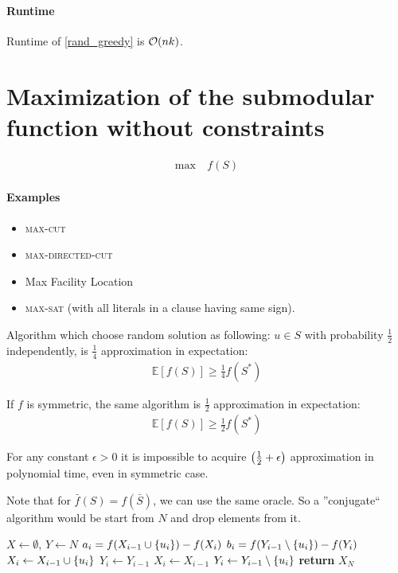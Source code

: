 \paragraph{Runtime} Runtime of \vref{rand_greedy} is $\order{nk}$.

\section{Maximization of the submodular function without constraints}
\begin{align}
\max \: & f(S)
\end{align}
\paragraph{Examples}
\begin{itemize}
\item \textsc{max-cut}
\item \textsc{max-directed-cut}
\item Max Facility Location
\item \textsc{max-sat} (with all literals in a clause having same sign).
\end{itemize}

\begin{prop}
	Algorithm which choose random solution as following: $u\in S$ with probability $\frac{1}{2}$ independently, is $\frac{1}{4}$ approximation in expectation:
	\begin{align}
	\mathbb{E}[f(S)] \geqslant \frac{1}{4} f(S^*)
	\end{align}
\end{prop}
\begin{prop}
If $f$ is symmetric, the same algorithm is $\frac{1}{2}$ approximation in expectation:
\begin{align}
\mathbb{E}[f(S)] \geqslant \frac{1}{2} f(S^*)
\end{align}
\end{prop}
\begin{prop}
For any constant $\epsilon>0$ it is impossible to acquire $\qty(\frac{1}{2}+\epsilon)$ approximation in polynomial time, even in  symmetric case.
\end{prop}

Note that for $\bar{f}(S) = f(\bar{S})$, we can use the same oracle. So a ''conjugate`` algorithm would be start from $N$ and drop elements from it.


\begin{algorithm}
	\caption{}\label{alg:double_greedy}
	\begin{algorithmic}[1]
		\State $X \gets \emptyset$, $Y \gets N$
		\State $a_i = f(X_{i-1} \cup \qty{u_i})-f(X_i)$
		\State $b_i = f(Y_{i-1} \setminus \qty{u_i})-f(Y_i)$
		\State $X_i \gets X_{i-1} \cup \qty{u_i}$
		\State $Y_i \gets Y_{i-1}$
		\Else
		\State $X_i \gets X_{i-1}$
		\State $Y_i \gets Y_{i-1} \setminus \qty{u_i}$
		\EndIf
		\EndFor
		\State \textbf{return} $X_N$
		\EndProcedure
	\end{algorithmic}
\end{algorithm}


